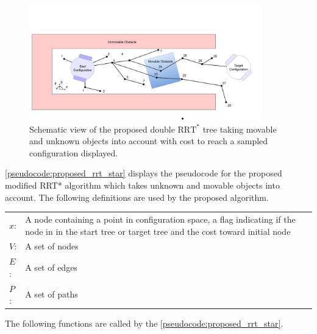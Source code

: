 \begin{figure}[H]
    \centering
    \includegraphics[width=0.9\textwidth]{figures/rrt_with_costs.png}
    \caption{Schematic view of the proposed double $\text{RRT}^*$ tree taking movable and unknown objects into account with cost to reach a sampled configuration displayed.}
    \label{fig:double_rrt_alg}
\end{figure}


\cref{pseudocode:proposed_rrt_star} displays the pseudocode for the proposed modified \ac{RRT*} algorithm which takes unknown and movable objects into account. The following definitions are used by the proposed algorithm.\bs


\begin{center}
\begin{tabular}[t]{l p{10cm}}
$x$:& A node containing a point in configuration space, a flag indicating if the node in in the start tree or target tree and the cost toward initial node\\
$V$:& A set of nodes\\
$E$:& A set of edges\\
$P$:& A set of paths\\
\end{tabular}
\end{center}


The following functions are called by the \cref{pseudocode:proposed_rrt_star}.\\ 

